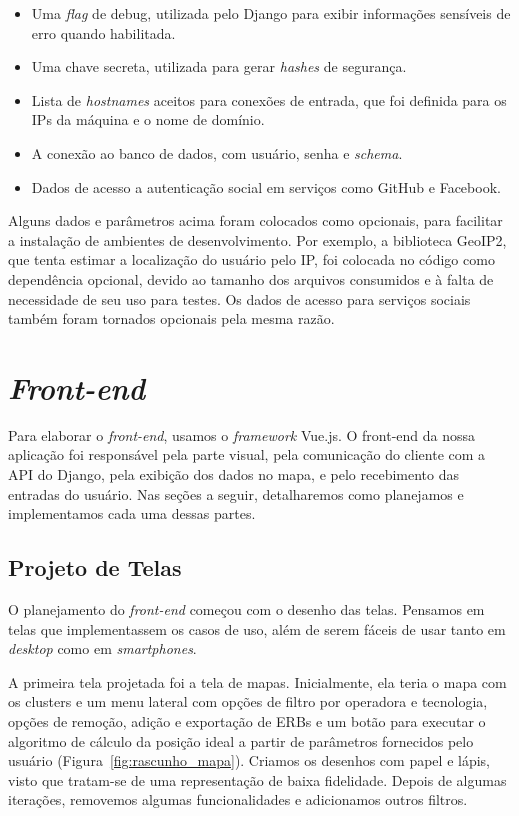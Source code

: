 \documentclass[]{politex}
\begin{document}
\begin{itemize}
\item Uma \textit{flag} de debug, utilizada pelo Django para exibir informações
sensíveis de erro quando habilitada.
\item Uma chave secreta, utilizada para gerar \textit{hashes} de segurança.
\item Lista de \textit{hostnames} aceitos para conexões de entrada, que foi
definida para os IPs da máquina e o nome de domínio.
\item A conexão ao banco de dados, com usuário, senha e \textit{schema}.
\item Dados de acesso a autenticação social em serviços como GitHub e Facebook.
\end{itemize}

Alguns dados e parâmetros acima foram colocados como opcionais, para facilitar a
instalação de ambientes de desenvolvimento. Por exemplo, a biblioteca GeoIP2,
que tenta estimar a localização do usuário pelo IP, foi colocada no código como
dependência opcional, devido ao tamanho dos arquivos consumidos e à falta de
necessidade de seu uso para testes. Os dados de acesso para serviços sociais
também foram tornados opcionais pela mesma razão.

\section{\textit{Front-end}}

Para elaborar o \textit{front-end}, usamos o \textit{framework} Vue.js. O
front-end da nossa aplicação foi responsável pela parte visual, pela comunicação
do cliente com a API do Django, pela exibição dos dados no mapa, e pelo
recebimento das entradas do usuário. Nas seções a seguir, detalharemos como
planejamos e implementamos cada uma dessas partes.

\subsection{Projeto de Telas}

O planejamento do \textit{front-end} começou com o desenho das telas. Pensamos
em telas que implementassem os casos de uso, além de serem fáceis de usar tanto
em \textit{desktop} como em \textit{smartphones}.

A primeira tela projetada foi a tela de mapas. Inicialmente, ela teria o mapa
com os clusters e um menu lateral com opções de filtro por operadora e
tecnologia, opções de remoção, adição e exportação de ERBs e um botão para
executar o algoritmo de cálculo da posição ideal a partir de parâmetros
fornecidos pelo usuário (Figura~\ref{fig:rascunho_mapa}). Criamos os desenhos
com papel e lápis, visto que tratam-se de uma representação de baixa fidelidade.
Depois de algumas iterações, removemos algumas funcionalidades e adicionamos
outros filtros.
\end{document}
